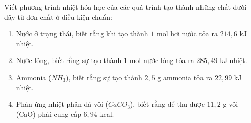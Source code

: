 \documentclass[Main.tex]{subfiles}
\begin{document}
	\begin{bt} Viết phương trình nhiệt hóa học của các quá trình tạo thành những chất dưới đây từ đơn chất ở điều kiện chuẩn:
		\begin{enumerate}
			\item[(a)] Nước ở trạng thái, biết rằng khi tạo thành $1$ mol hơi nước tỏa ra $214{,}6$ kJ nhiệt.
			\item[(b)] Nước lỏng, biết rằng sự tạo thành $1$ mol nước lỏng tỏa ra $285{,}49$ kJ nhiệt.
			\item[(c)] Ammonia ($NH_3$), biết rằng sự tạo thành $2{,}5$ g ammonia tỏa ra $22{,}99$ kJ nhiệt.
			\item[(d)] Phản ứng nhiệt phân đá vôi ($CaCO_3$), biết rằng để thu được $11{,}2$ g vôi (CaO) phải cung cấp $6{,}94$ kcal.
		\end{enumerate}
	\end{bt}
\end{document}
